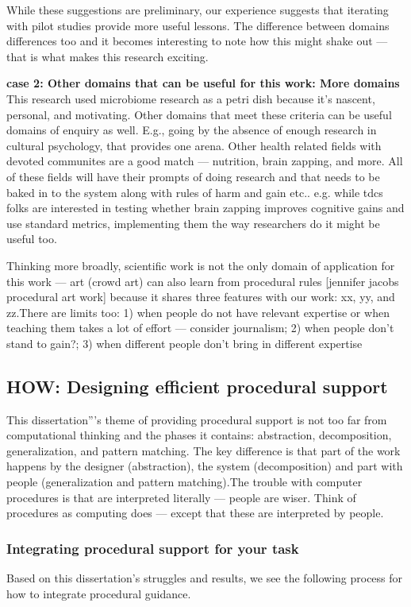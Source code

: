 While these suggestions are preliminary, our experience suggests that iterating with pilot studies provide more useful lessons. The difference between domains differences too and it becomes interesting to note how this might shake out — that is what makes this research exciting.

\textbf{case 2: Other domains that can be useful for this work: More domains}
This research used microbiome research as a petri dish because it’s nascent, personal, and motivating. Other domains that meet these criteria can be useful domains of enquiry as well. E.g., going by the absence of enough research in cultural psychology, that provides one arena. Other health related fields with devoted communites are a good match — nutrition, brain zapping, and more. All of these fields will have their prompts of doing research and that needs to be baked in to the system along with rules of harm and gain etc..  e.g. while tdcs folks are interested in testing whether brain zapping improves cognitive gains and use standard metrics, implementing them the way researchers do it might be useful too.

Thinking more broadly, scientific work is not the only domain of application for this work — art (crowd art) can also learn from procedural rules [jennifer jacobs procedural art work] because it shares three features with our work: xx, yy, and zz.There are limits too: 1) when people do not have relevant expertise or when teaching them takes a lot of effort — consider journalism; 2)  when people don’t stand to gain?; 3)  when different people don’t bring in different expertise

\subsection{HOW: Designing efficient procedural support}

This dissertation'''s theme of providing procedural support is not too far from computational thinking and the phases it contains: abstraction, decomposition, generalization, and pattern matching. The key difference is that part of the work happens  by the designer (abstraction), the system (decomposition) and part with people (generalization and pattern matching).The trouble with computer procedures is that are interpreted literally — people are wiser. Think of procedures as computing does — except that these are interpreted by people.

\subsubsection{Integrating procedural support for your task}
Based on this dissertation's struggles and results, we see the following process for how to integrate procedural guidance. 


